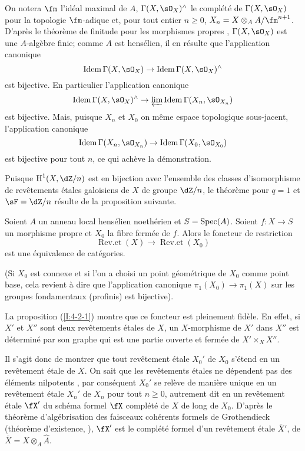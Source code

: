 On notera $\fm$ l'idéal maximal de $A$, $\Gamma(X,\sO_X)^\wedge$ le complété 
de $\Gamma(X,\sO_X)$ pour la topologie $\fm$-adique et, pour tout entier 
$n\geqslant 0$, $X_n=X\otimes_A A/\fm^{n+1}$. D'après le théorème de finitude 
pour les morphismes propres \cite[III.3.2]{ega}, $\Gamma(X,\sO_X)$ est une 
$A$-algèbre finie; comme $A$ est hensélien, il en résulte que 
l'application canonique 
\[
  \operatorname{Idem} \Gamma(X,\sO_X) \to \operatorname{Idem}\Gamma(X,\sO_X)^\wedge
\]
est bijective. En particulier l'application canonique 
\[
  \operatorname{Idem} \Gamma(X,\sO_X)^\wedge \to \varprojlim \operatorname{Idem}\Gamma(X_n,\sO_{X_n})
\]
est bijective. Mais, puisque $X_n$ et $X_0$ on même espace topologique 
sous-jacent, l'application canonique 
\[
  \operatorname{Idem}\Gamma(X_n,\sO_{X_n}) \to \operatorname{Idem} \Gamma(X_0,\sO_{X_0})
\]
est bijective pour tout $n$, ce qui achève la démonstration. 

Puisque $\h^1(X,\dZ/n)$ est en bijection avec l'ensemble des classes 
d'isomorphisme de revêtements étales galoisiens de $X$ de groupe $\dZ/n$, 
le théorème  pour $q=1$ et $\sF=\dZ/n$ résulte de la proposition suivante. 





\begin{proposition}\label{I:4-2-2}
Soient $A$ un anneau local hensélien noethérien et $S=\operatorname{Spec}(A)$. Soient 
$f:X\to S$ un morphisme propre et $X_0$ la fibre fermée de $f$. Alors le 
foncteur de restriction 
\[
  \operatorname{Rev.et}(X) \to \operatorname{Rev.et}(X_0)
\]
est une équivalence de catégories. 
\end{proposition}

(Si $X_0$ est connexe et si l'on a choisi un point géométrique de $X_0$ 
comme point base, cela revient à dire que l'application canonique 
$\pi_1(X_0)\to \pi_1(X)$ sur les groupes fondamentaux (profinis) est 
bijective). 

La proposition (\ref{I:4-2-1}) montre que ce foncteur est pleinement fidèle. En 
effet, si $X'$ et $X''$ sont deux revêtements étales de $X$, un 
$X$-morphisme de $X'$ dans $X''$ est déterminé par son graphe qui est une 
partie ouverte et fermée de $X'\times_X X''$. 

Il s'agit donc de montrer que tout revêtement étale $X_0'$ de $X_0$ s'étend 
en un revêtement étale de $X$. On sait que les revêtements étales ne 
dépendent pas des éléments nilpotents \cite[ch.1]{sga1}, par conséquent 
$X_0'$ se relève de manière unique en un revêtement étale $X_n'$ de 
$X_n$ pour tout $n\geqslant 0$, autrement dit en un revêtement étale 
$\fX'$ du schéma formel $\fX$ complété de $X$ de long de $X_0$. D'après 
le théorème d'algébrisation des faisceaux cohérents formels de 
Grothendieck (théorème d'existence, \cite[III.5]{ega}), $\fX'$ est le 
complété formel d'un revêtement étale $\bar X'$, de 
$\bar X=X\otimes_A \hat A$. 

